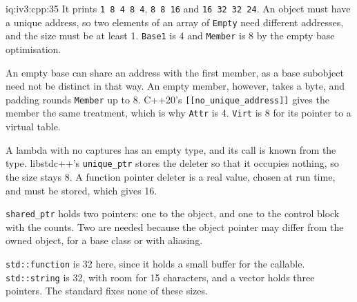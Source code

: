 \begin{solution}{iq:iv3:cpp:35}
It prints \texttt{1 8 4 8 4}, \texttt{8 8 16} and \texttt{16 32 32 24}. An object must have a unique address, so two elements of an array of \texttt{Empty} need different addresses, and the size must be at least 1. \texttt{Base1} is 4 and \texttt{Member} is 8 by the empty base optimisation.

An empty base can share an address with the first member, as a base subobject need not be distinct in that way. An empty member, however, takes a byte, and padding rounds \texttt{Member} up to 8. C++20's \texttt{[[no\_unique\_address]]} gives the member the same treatment, which is why \texttt{Attr} is 4. \texttt{Virt} is 8 for its pointer to a virtual table.

A lambda with no captures has an empty type, and its call is known from the type. libstdc++'s \texttt{unique\_ptr} stores the deleter so that it occupies nothing, so the size stays 8. A function pointer deleter is a real value, chosen at run time, and must be stored, which gives 16.

\texttt{shared\_ptr} holds two pointers: one to the object, and one to the control block with the counts. Two are needed because the object pointer may differ from the owned object, for a base class or with aliasing.

\texttt{std::function} is 32 here, since it holds a small buffer for the callable. \texttt{std::string} is 32, with room for 15 characters, and a vector holds three pointers. The standard fixes none of these sizes.

\end{solution}

